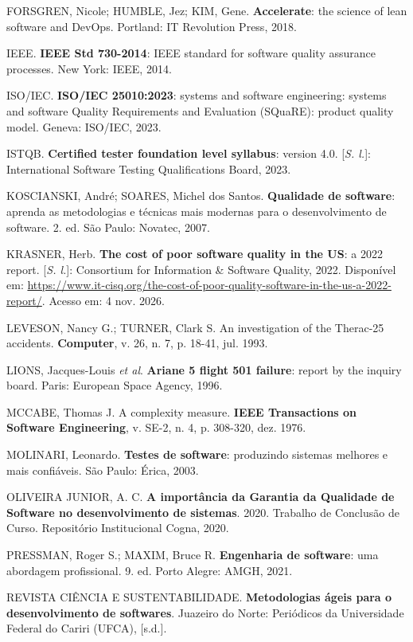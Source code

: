 \documentclass[12pt,a4paper]{article}
\begin{document}
\begin{singlespace}
FORSGREN, Nicole; HUMBLE, Jez; KIM, Gene. \textbf{Accelerate}: the science of lean software and DevOps. Portland: IT Revolution Press, 2018.

IEEE. \textbf{IEEE Std 730-2014}: IEEE standard for software quality assurance processes. New York: IEEE, 2014.

ISO/IEC. \textbf{ISO/IEC 25010:2023}: systems and software engineering: systems and software Quality Requirements and Evaluation (SQuaRE): product quality model. Geneva: ISO/IEC, 2023.

ISTQB. \textbf{Certified tester foundation level syllabus}: version 4.0. [\textit{S. l.}]: International Software Testing Qualifications Board, 2023.

KOSCIANSKI, André; SOARES, Michel dos Santos. \textbf{Qualidade de software}: aprenda as metodologias e técnicas mais modernas para o desenvolvimento de software. 2. ed. São Paulo: Novatec, 2007.

KRASNER, Herb. \textbf{The cost of poor software quality in the US}: a 2022 report. [\textit{S. l.}]: Consortium for Information \& Software Quality, 2022. Disponível em: \url{https://www.it-cisq.org/the-cost-of-poor-quality-software-in-the-us-a-2022-report/}. Acesso em: 4 nov. 2026.

LEVESON, Nancy G.; TURNER, Clark S. An investigation of the Therac-25 accidents. \textbf{Computer}, v. 26, n. 7, p. 18-41, jul. 1993.

LIONS, Jacques-Louis \textit{et al}. \textbf{Ariane 5 flight 501 failure}: report by the inquiry board. Paris: European Space Agency, 1996.

MCCABE, Thomas J. A complexity measure. \textbf{IEEE Transactions on Software Engineering}, v. SE-2, n. 4, p. 308-320, dez. 1976.

MOLINARI, Leonardo. \textbf{Testes de software}: produzindo sistemas melhores e mais confiáveis. São Paulo: Érica, 2003.

OLIVEIRA JUNIOR, A. C. \textbf{A importância da Garantia da Qualidade de Software no desenvolvimento de sistemas}. 2020. Trabalho de Conclusão de Curso. Repositório Institucional Cogna, 2020.

PRESSMAN, Roger S.; MAXIM, Bruce R. \textbf{Engenharia de software}: uma abordagem profissional. 9. ed. Porto Alegre: AMGH, 2021.

REVISTA CIÊNCIA E SUSTENTABILIDADE. \textbf{Metodologias ágeis para o desenvolvimento de softwares}. Juazeiro do Norte: Periódicos da Universidade Federal do Cariri (UFCA), [s.d.].


\end{singlespace}
\end{document}
